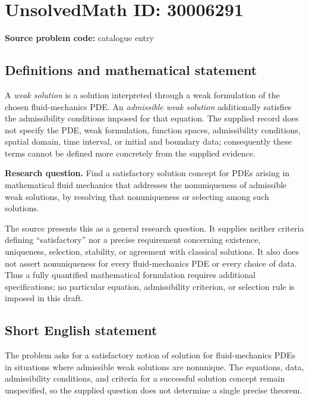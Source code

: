 \documentclass[11pt]{article}
\begin{document}
\section*{UnsolvedMath ID: 30006291}
\textbf{Source problem code:} catalogue entry
\subsection{Definitions and mathematical statement}
A \emph{weak solution} is a solution interpreted through a weak formulation of the chosen fluid-mechanics PDE. An \emph{admissible weak solution} additionally satisfies the admissibility conditions imposed for that equation. The supplied record does not specify the PDE, weak formulation, function spaces, admissibility conditions, spatial domain, time interval, or initial and boundary data; consequently these terms cannot be defined more concretely from the supplied evidence.

\textbf{Research question.} Find a satisfactory solution concept for PDEs arising in mathematical fluid mechanics that addresses the nonuniqueness of admissible weak solutions, by resolving that nonuniqueness or selecting among such solutions.

The source presents this as a general research question. It supplies neither criteria defining ``satisfactory'' nor a precise requirement concerning existence, uniqueness, selection, stability, or agreement with classical solutions. It also does not assert nonuniqueness for every fluid-mechanics PDE or every choice of data. Thus a fully quantified mathematical formulation requires additional specifications; no particular equation, admissibility criterion, or selection rule is imposed in this draft.
\subsection{Short English statement}
The problem asks for a satisfactory notion of solution for fluid-mechanics PDEs in situations where admissible weak solutions are nonunique. The equations, data, admissibility conditions, and criteria for a successful solution concept remain unspecified, so the supplied question does not determine a single precise theorem.
\end{document}
